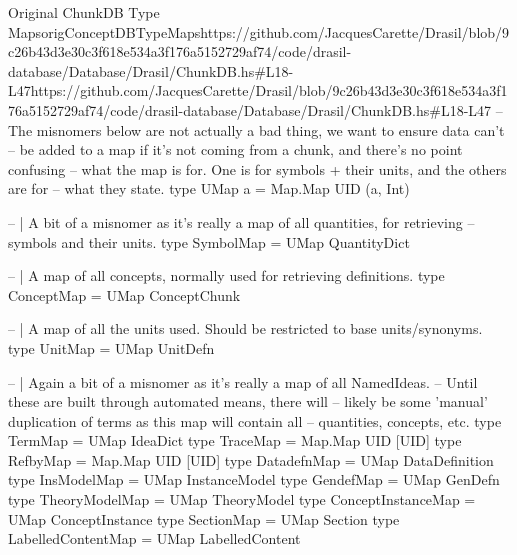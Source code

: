 \begin{haskell}{Original ChunkDB Type Maps}{origConceptDBTypeMaps}{https://github.com/JacquesCarette/Drasil/blob/9c26b43d3e30c3f618e534a3f176a5152729a\newline{}f74/code/drasil-database/Database/Drasil/ChunkDB.hs\#L18-L47}{https://github.com/JacquesCarette/Drasil/blob/9c26b43d3e30c3f618e534a3f176a5152729af74/code/drasil-database/Database/Drasil/ChunkDB.hs\#L18-L47}
-- The misnomers below are not actually a bad thing, we want to ensure data can't
-- be added to a map if it's not coming from a chunk, and there's no point confusing
-- what the map is for. One is for symbols + their units, and the others are for
-- what they state.
type UMap a = Map.Map UID (a, Int)

-- | A bit of a misnomer as it's really a map of all quantities, for retrieving
-- symbols and their units.
type SymbolMap  = UMap QuantityDict

-- | A map of all concepts, normally used for retrieving definitions.
type ConceptMap = UMap ConceptChunk

-- | A map of all the units used. Should be restricted to base units/synonyms.
type UnitMap = UMap UnitDefn

-- | Again a bit of a misnomer as it's really a map of all NamedIdeas.
-- Until these are built through automated means, there will
-- likely be some 'manual' duplication of terms as this map will contain all
-- quantities, concepts, etc.
type TermMap = UMap IdeaDict
type TraceMap = Map.Map UID [UID]
type RefbyMap = Map.Map UID [UID]
type DatadefnMap = UMap DataDefinition
type InsModelMap = UMap InstanceModel
type GendefMap = UMap GenDefn
type TheoryModelMap = UMap TheoryModel
type ConceptInstanceMap = UMap ConceptInstance
type SectionMap = UMap Section
type LabelledContentMap = UMap LabelledContent
\end{haskell}

